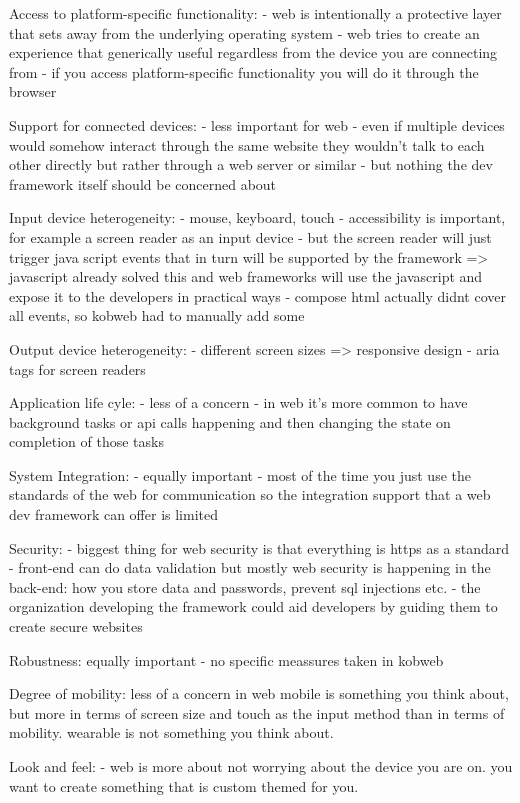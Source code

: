 Access to platform-specific functionality:
- web is intentionally a protective layer that sets away from the underlying operating system
- web tries to create an experience that generically useful regardless from the device you are connecting from
- if you access platform-specific functionality you will do it through the browser

Support for connected devices: 
- less important for web
- even if multiple devices would somehow interact through the same website they wouldn't talk to each other directly but rather through a web server or similar
- but nothing the dev framework itself should be concerned about

Input device heterogeneity: 
- mouse, keyboard, touch
- accessibility is important, for example a screen reader as an input device
- but the screen reader will just trigger java script events that in turn will be supported by the framework
=> javascript already solved this and web frameworks will use the javascript and expose it to the developers in practical ways
- compose html actually didnt cover all events, so kobweb had to manually add some

Output device heterogeneity: 
- different screen sizes => responsive design
- aria tags for screen readers

Application life cyle: 
- less of a concern
- in web it's more common to have background tasks or api calls happening and then changing the state on completion of those tasks

System Integration: 
- equally important
- most of the time you just use the standards of the web for communication so the integration support that a web dev framework can offer is limited

Security: 
- biggest thing for web security is that everything is https as a standard
- front-end can do data validation but mostly web security is happening in the back-end: how you store data and passwords, prevent sql injections etc. 
- the organization developing the framework could aid developers by guiding them to create secure websites

Robustness: 
equally important
- no specific meassures taken in kobweb

Degree of mobility:
less of a concern in web
mobile is something you think about, but more in terms of screen size and touch as the input method than in terms of mobility.
wearable is not something you think about.

Look and feel: 
- web is more about not worrying about the device you are on. 
you want to create something that is custom themed for you. 

